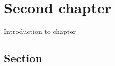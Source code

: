 \chapter{Second chapter}
\label{chap:second-chapter}
Introduction to chapter

\section{Section}
\label{sec:second-section}

\newpage